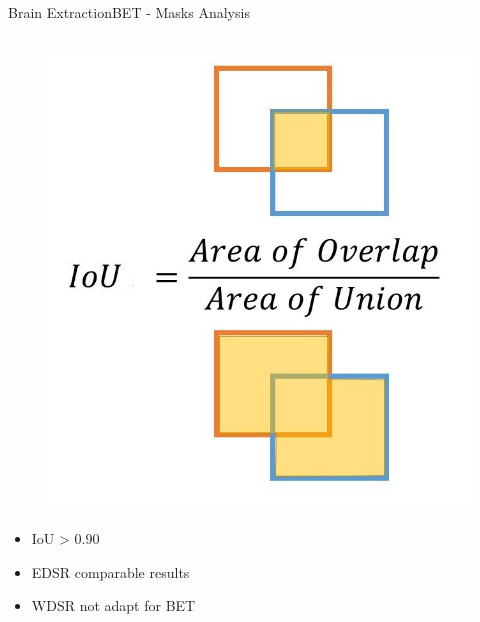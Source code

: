 \documentclass[10pt, unicode]{beamer}
\begin{document}
\begin{frame}{Brain Extraction}{BET - Masks Analysis}
\begin{columns}
    \begin{column}{0.5\textwidth}
      \vspace{-1cm}
      \begin{figure}
        \includegraphics[scale=0.15]{./images/IoU-ex.jpg}
      \end{figure}
      \begin{itemize}
        \item IoU > 0.90
        \item EDSR comparable results
        \item WDSR not adapt for BET 
      \end{itemize}
    \end{column}
  \end{columns}
\end{frame}
\end{document}
